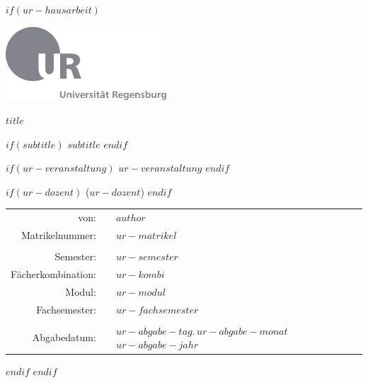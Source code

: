 \documentclass[$if(fontsize)$$fontsize$,$endif$$if(lang)$$lang$,$endif$$if(papersize)$$papersize$,$endif$$for(classoption)$$classoption$$sep$,$endfor$]{$documentclass$}
\begin{document}
$if(ur-hausarbeit)$
\begin{titlepage}
  \begin{center}

  \hbox{\hspace{2.74cm}\includegraphics[width=0.45\textwidth]{Template/UR-Logo/ur-logo-mit-text.pdf}}

  \vspace{1.8cm}

  {\huge\textbf{$title$}}

  $if(subtitle)$
  \vspace{0.8cm}
  {\large{$subtitle$}}
  $endif$

  \vspace{1.5cm}

  $if(ur-veranstaltung)$
  $ur-veranstaltung$
  $endif$

  $if(ur-dozent)$
  ($ur-dozent$)
  $endif$

  \vspace{0.8cm}

  \begin{center}
  \begin{tabular}{ r c l }
  von:               &  & $author$                                     \\
  Matrikelnummer:    &  & $ur-matrikel$                                \\
                     &  &                                              \\
  Semester:          &  & $ur-semester$                                \\
  Fächerkombination: &  & \parbox[t]{6cm}{$ur-kombi$}                \\
  Modul:             &  & $ur-modul$                                   \\
  Fachsemester:      &  & $ur-fachsemester$                            \\
                     &  &                                              \\
  Abgabedatum:       &  & $ur-abgabe-tag$.\,$ur-abgabe-monat$\,$ur-abgabe-jahr$
  \end{tabular}
  \end{center}
  \end{center}
\end{titlepage}
$endif$
$endif$
\end{document}
